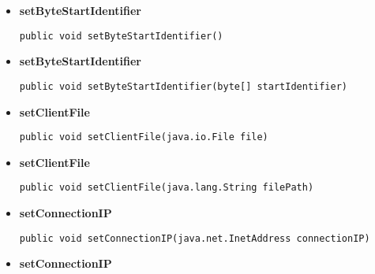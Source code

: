 {{{{{\begin{itemize}
{\hypertarget{filetransferUDP.FileTransfer.setByteSessionNumber(byte[])}{{\bf  setByteSessionNumber}\\}
\begin{lstlisting}[frame=none]
public void setByteSessionNumber(byte[] sessionNumber)\end{lstlisting} %
}%
\item{ 
\hypertarget{filetransferUDP.FileTransfer.setByteStartIdentifier()}{{\bf  setByteStartIdentifier}\\}
\begin{lstlisting}[frame=none]
public void setByteStartIdentifier()\end{lstlisting} %
}%
\item{ 
\hypertarget{filetransferUDP.FileTransfer.setByteStartIdentifier(byte[])}{{\bf  setByteStartIdentifier}\\}
\begin{lstlisting}[frame=none]
public void setByteStartIdentifier(byte[] startIdentifier)\end{lstlisting} %
}%
\item{ 
\hypertarget{filetransferUDP.FileTransfer.setClientFile(java.io.File)}{{\bf  setClientFile}\\}
\begin{lstlisting}[frame=none]
public void setClientFile(java.io.File file)\end{lstlisting} %
}%
\item{ 
\hypertarget{filetransferUDP.FileTransfer.setClientFile(java.lang.String)}{{\bf  setClientFile}\\}
\begin{lstlisting}[frame=none]
public void setClientFile(java.lang.String filePath)\end{lstlisting} %
}%
\item{ 
\hypertarget{filetransferUDP.FileTransfer.setConnectionIP(java.net.InetAddress)}{{\bf  setConnectionIP}\\}
\begin{lstlisting}[frame=none]
public void setConnectionIP(java.net.InetAddress connectionIP)\end{lstlisting} %
}%
\item{ 
\hypertarget{filetransferUDP.FileTransfer.setConnectionIP(java.lang.String)}{{\bf  setConnectionIP}\\}
}
\end{itemize}}}}}}
